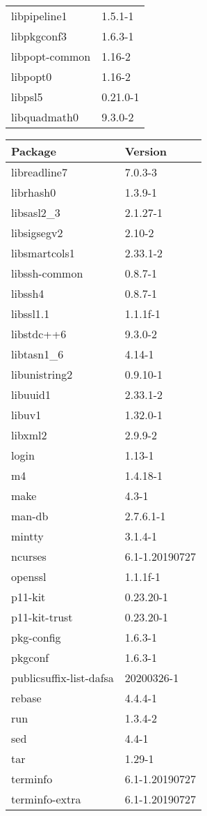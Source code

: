 \documentclass[10pt, english, openany]{report}
\begin{document}
\begin{appendices}
\begin{center}
\begin{tabular}{|m{3cm}|m{3cm}|}
libpipeline1 & 1.5.1-1 \\
libpkgconf3 & 1.6.3-1 \\
libpopt-common & 1.16-2 \\
libpopt0 & 1.16-2 \\
libpsl5 & 0.21.0-1 \\
libquadmath0 & 9.3.0-2 \\
\hline
\end{tabular}
\begin{tabular}{|m{3cm}|m{3cm}|}
Package & Version \\
\hline
libreadline7 & 7.0.3-3 \\
librhash0 & 1.3.9-1 \\
libsasl2\_3 & 2.1.27-1 \\
libsigsegv2 & 2.10-2 \\
libsmartcols1 & 2.33.1-2 \\
libssh-common & 0.8.7-1 \\
libssh4 & 0.8.7-1 \\
libssl1.1 & 1.1.1f-1 \\
libstdc++6 & 9.3.0-2 \\
libtasn1\_6 & 4.14-1 \\
libunistring2 & 0.9.10-1 \\
libuuid1 & 2.33.1-2 \\
libuv1 & 1.32.0-1 \\
libxml2 & 2.9.9-2 \\
login & 1.13-1 \\
m4 & 1.4.18-1 \\
make & 4.3-1 \\
man-db & 2.7.6.1-1 \\
mintty & 3.1.4-1 \\
ncurses & 6.1-1.20190727 \\
openssl & 1.1.1f-1 \\
p11-kit & 0.23.20-1 \\
p11-kit-trust & 0.23.20-1 \\
pkg-config & 1.6.3-1 \\
pkgconf & 1.6.3-1 \\
publicsuffix-list-dafsa & 20200326-1 \\
rebase & 4.4.4-1 \\
run & 1.3.4-2 \\
sed & 4.4-1 \\
tar & 1.29-1 \\
terminfo & 6.1-1.20190727 \\
terminfo-extra & 6.1-1.20190727 \\

\end{tabular}
\end{center}
\end{appendices}
\end{document}
